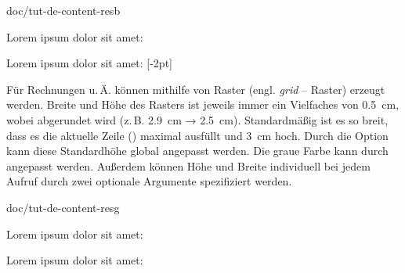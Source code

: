 \begin{codefilecontent}{doc/tut-de-content-resb}

Lorem ipsum dolor sit amet: 

Lorem ipsum dolor sit amet: [-2pt]
\end{codefilecontent}
\endcode

Für Rechnungen u.\,Ä. können mithilfe von \Macro\resg Raster (engl. \emph{grid} – Raster) erzeugt werden. Breite und Höhe des Rasters ist jeweils immer ein Vielfaches von \SI{0.5}{cm}, wobei abgerundet wird (z.\,B. \SI{2.9}{cm} → \SI{2.5}{cm}). Standardmäßig ist es so breit, dass es die aktuelle Zeile () maximal ausfüllt und \SI{3}{cm} hoch. Durch die Option  kann diese Standardhöhe global angepasst werden. Die graue Farbe kann durch  angepasst werden. Außerdem können Höhe und Breite individuell bei jedem Aufruf durch zwei optionale Argumente spezifiziert werden.

\begin{codefilecontent}{doc/tut-de-content-resg}

Lorem ipsum dolor sit amet: 


Lorem ipsum dolor sit amet: 

\end{codefilecontent}
\endcode

